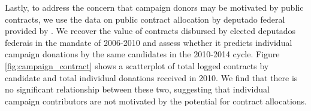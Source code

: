 \documentclass[12pt,english]{article}
\numberwithin{equation}{section}
\theoremstyle{plain}
\theoremstyle{remark}
\theoremstyle{plain}
\begin{document}
Lastly, to address the concern that campaign donors may be motivated by public contracts, we use the data on public contract allocation by deputado federal provided by . We recover the value of contracts disbursed by elected deputados federais in the mandate of 2006-2010 and assess whether it predicts individual campaign donations by the same candidates in the 2010-2014 cycle. Figure \ref{fig:campaign_contract} shows a scatterplot of total logged contracts by candidate and total individual donations received in 2010. We find that there is no significant relationship between these two, suggesting that individual campaign contributors are not motivated by the potential for contract allocations.

\end{document}
